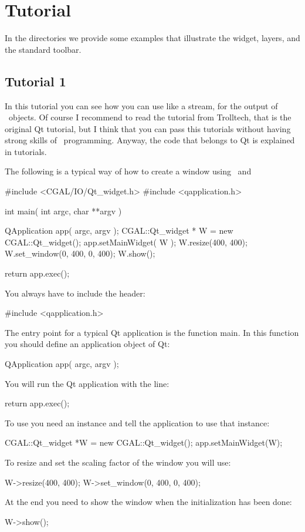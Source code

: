 
\section{Tutorial}

In the directories  we provide some examples that illustrate the widget, layers, and the standard toolbar.

\subsection*{Tutorial 1}

In this tutorial you can see how you can use  like
a stream, for the output of \cgal\ objects.  Of course I recommend to read
the tutorial from Trolltech, that is the original Qt tutorial, but I
think that you can pass this tutorials without having strong skills of \qt\
programming. Anyway, the code that belongs to Qt is explained in tutorials.

The following is a typical way of how to create a window using
\qt\ and 
\begin{ccExampleCode}
#include <CGAL/IO/Qt_widget.h>
#include <qapplication.h>

int main( int argc, char **argv )
{
    QApplication app( argc, argv );
    CGAL::Qt_widget * W = new CGAL::Qt_widget();
    app.setMainWidget( W );
    W.resize(400, 400);
    W.set_window(0, 400, 0, 400);
    W.show();

    return app.exec();
}
\end{ccExampleCode}
You always have to include the header:
\begin{ccExampleCode}
#include <qapplication.h>
\end{ccExampleCode}

The entry point for a typical Qt application is the function main. In
this function you should define an application object of Qt:
\begin{ccExampleCode}
QApplication app( argc, argv );
\end{ccExampleCode}
You will run the Qt application with the line:
\begin{ccExampleCode}
return app.exec();
\end{ccExampleCode}
To use  you need an instance and tell the
application to use that instance:
\begin{ccExampleCode}
CGAL::Qt_widget *W = new CGAL::Qt_widget();
app.setMainWidget(W);
\end{ccExampleCode}
To resize and set the scaling factor of the window you will use:
\begin{ccExampleCode}
W->resize(400, 400);
W->set_window(0, 400, 0, 400);
\end{ccExampleCode}
At the end you need to show the window when the initialization has been done:
\begin{ccExampleCode}
W->show();
\end{ccExampleCode}

